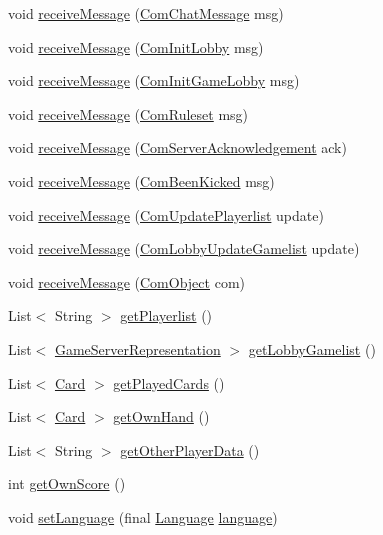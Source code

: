 \begin{DoxyCompactItemize}
\item 
void \hyperlink{a00003_a07aee9bb24715762e17435d64403d638}{receive\-Message} (\hyperlink{a00026}{Com\-Chat\-Message} msg)
\item 
void \hyperlink{a00003_a57fa0509cf6dcf8e9ef762c117e0521d}{receive\-Message} (\hyperlink{a00032}{Com\-Init\-Lobby} msg)
\item 
void \hyperlink{a00003_acee963db7bc6d062b092bfb40e713459}{receive\-Message} (\hyperlink{a00031}{Com\-Init\-Game\-Lobby} msg)
\item 
void \hyperlink{a00003_a8f06e6959f3e1c3bcea87c8c9dc15685}{receive\-Message} (\hyperlink{a00038}{Com\-Ruleset} msg)
\item 
void \hyperlink{a00003_ae65b0a1a7898759025fba20de60c0d5f}{receive\-Message} (\hyperlink{a00039}{Com\-Server\-Acknowledgement} ack)
\item 
void \hyperlink{a00003_a2ac49a8d4b6df78c386c347f6cb22a10}{receive\-Message} (\hyperlink{a00025}{Com\-Been\-Kicked} msg)
\item 
void \hyperlink{a00003_a9aaedddc399107717ed8be7e536ffcbb}{receive\-Message} (\hyperlink{a00041}{Com\-Update\-Playerlist} update)
\item 
void \hyperlink{a00003_a574431d2f9f8ca6ec01023f4b5cd5518}{receive\-Message} (\hyperlink{a00035}{Com\-Lobby\-Update\-Gamelist} update)
\item 
void \hyperlink{a00003_a680d5eab630ce98d35cf0a05e4d8c1ac}{receive\-Message} (\hyperlink{a00037}{Com\-Object} com)
\item 
List$<$ String $>$ \hyperlink{a00003_a04dc864cba20400b253dd787e20d97b6}{get\-Playerlist} ()
\item 
List$<$ \hyperlink{a00073}{Game\-Server\-Representation} $>$ \hyperlink{a00003_a0f33c3ac883d05b27be54ebdae730d9b}{get\-Lobby\-Gamelist} ()
\item 
List$<$ \hyperlink{a00054}{Card} $>$ \hyperlink{a00003_a0146da6e5736418de59de4ce9ac28eff}{get\-Played\-Cards} ()
\item 
List$<$ \hyperlink{a00054}{Card} $>$ \hyperlink{a00003_a1b82d59f9b439be5785c6faffd4d3c05}{get\-Own\-Hand} ()
\item 
List$<$ String $>$ \hyperlink{a00003_abfb50b9812bdeca9c479fb071b36c365}{get\-Other\-Player\-Data} ()
\item 
int \hyperlink{a00003_a5a731ac22c3365c7c7f783d37ab15de7}{get\-Own\-Score} ()
\item 
void \hyperlink{a00003_a7464e992189497a4a9294b200522e84b}{set\-Language} (final \hyperlink{a00015}{Language} \hyperlink{a00003_a431aadd49e0ba3c9fb62b88ced697cc4}{language})

\end{DoxyCompactItemize}
